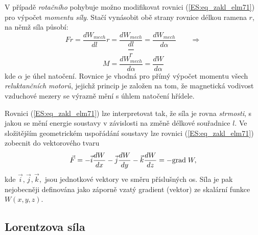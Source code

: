       V	případě \emph{rotačního} pohybuje možno modifikovat rovnici (\ref{ES:eq_zakl_elm71}) pro 
      výpočet \emph{momentu síly}. Stačí vynásobit obě strany rovnice délkou ramena \(r\), na němž 
      síla působí:
      \begin{equation*}
        Fr = \frac{dW_{mech}}{dl}r 
           = \frac{dW_{mech}}{\dfrac{dl}{r}} 
           = \frac{dW_{mech}}{d\alpha}
             \qquad \Longrightarrow
      \end{equation*}
      \begin{equation}\label{ES:eq_zakl_elm82}
        \boxed{M = \frac{dW_{mech}}{d\alpha} = \frac{dW}{d\alpha}}
      \end{equation}
      kde \(\alpha\) je úhel natočení. Rovnice je vhodná pro přímý výpočet momentu všech 
      \emph{reluktančních motorů}, jejichž princip je založen na tom, že magnetická vodivost 
      vzduchové mezery se výrazně mění s úhlem natočení hřídele.
      
      Rovnici (\ref{ES:eq_zakl_elm71}) lze interpretovat tak, že síla je rovna \emph{strmosti}, s 
      jakou se mění energie soustavy v závislosti na změně délkové souřadnice \(l\). Ve složitějším 
      geometrickém uspořádání soustavy lze rovnici (\ref{ES:eq_zakl_elm71}) zobecnit do vektorového 
      tvaru
      \begin{equation}\label{ES:eq_zakl_elm83}
       \vec{F} = -\vec{i}\frac{dW}{dx} -\vec{j}\frac{dW}{dy} -\vec{k}\frac{dW}{dz} = - \mathrm{grad\;}W,
      \end{equation}
      kde \(\vec{i}, \vec{j}, \vec{k},\) jsou jednotkové vektory ve směru příslušných os. Síla je 
      pak nejobecněji definována jako záporně vzatý gradient (vektor) ze skalární funkce 
      \(W(x,y,z)\).
      
    \subsection{Lorentzova síla}
      
